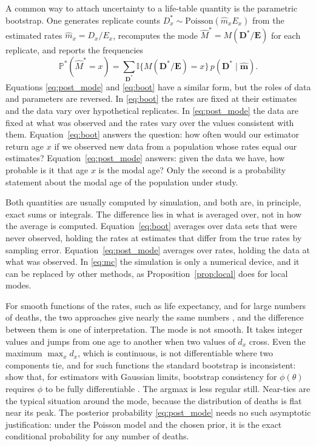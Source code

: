 \documentclass[12pt, letterpaper]{article}
\begin{document}
A common way to attach uncertainty to a life-table quantity is the parametric bootstrap. One generates replicate counts $D_x^\ast \sim \text{Poisson}(\hat m_x E_x)$ from the estimated rates $\hat m_x = D_x / E_x$, recomputes the mode $\hat M^\ast = M(\bm{D}^\ast / \bm{E})$ for each replicate, and reports the frequencies
\begin{equation}
\mathbb{P}^\ast(\hat M^\ast = x) = \sum_{\bm{D}^\ast} \mathbb{I}\{M(\bm{D}^\ast/\bm{E}) = x\}\, p(\bm{D}^\ast \mid \hat{\bm{m}}).
\label{eq:boot}
\end{equation}
Equations \eqref{eq:post_mode} and \eqref{eq:boot} have a similar form, but the roles of data and parameters are reversed. In \eqref{eq:boot} the rates are fixed at their estimates and the data vary over hypothetical replicates. In \eqref{eq:post_mode} the data are fixed at what was observed and the rates vary over the values consistent with them. Equation~\eqref{eq:boot} answers the question: how often would our estimator return age $x$ if we observed new data from a population whose rates equal our estimates? Equation~\eqref{eq:post_mode} answers: given the data we have, how probable is it that age $x$ is the modal age? Only the second is a probability statement about the modal age of the population under study.

Both quantities are usually computed by simulation, and both are, in principle, exact sums or integrals. The difference lies in what is averaged over, not in how the average is computed. Equation~\eqref{eq:boot} averages over data sets that were never observed, holding the rates at estimates that differ from the true rates by sampling error. Equation~\eqref{eq:post_mode} averages over rates, holding the data at what was observed. In \eqref{eq:mc} the simulation is only a numerical device, and it can be replaced by other methods, as Proposition~\ref{prop:local} does for local modes.

For smooth functions of the rates, such as life expectancy, and for large numbers of deaths, the two approaches give nearly the same numbers \citep{van2000asymptotic}, and the difference between them is one of interpretation. The mode is not smooth. It takes integer values and jumps from one age to another when two values of $d_x$ cross. Even the maximum $\max_x d_x$, which is continuous, is not differentiable where two components tie, and for such functions the standard bootstrap is inconsistent: \citet{fang2019inference} show that, for estimators with Gaussian limits, bootstrap consistency for $\phi(\theta)$ requires $\phi$ to be fully differentiable \citep[see also][]{andrews2000inconsistency}. The argmax is less regular still. Near-ties are the typical situation around the mode, because the distribution of deaths is flat near its peak. The posterior probability \eqref{eq:post_mode} needs no such asymptotic justification: under the Poisson model and the chosen prior, it is the exact conditional probability for any number of deaths.
\end{document}
